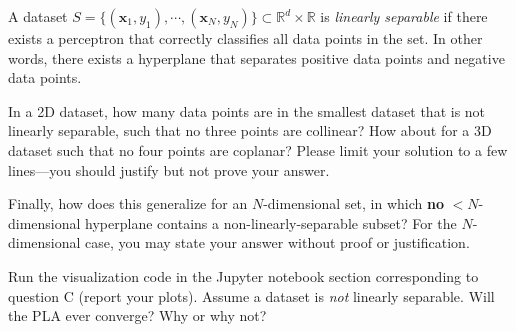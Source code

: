 \begin{solution}


\end{solution}

\begin{problem}[4]
A dataset $S = \{(\mathbf{x}_1, y_1),\cdots,(\mathbf{x}_N, y_N)\} \subset \mathbb{R}^d \times \mathbb{R}$ is \emph{linearly separable} if there exists a perceptron that correctly classifies all data points in the set.
In other words, there exists a hyperplane that separates positive data points and negative data points.

In a 2D dataset, how many data points are in the smallest dataset that is not linearly separable, such that no three points are collinear? How about for a 3D dataset such that no four points are coplanar?
Please limit your solution to a few lines---you should justify but not prove your answer.

Finally, how does this generalize for an $N$-dimensional set, in which \textbf{no} $<$$N$-dimensional hyperplane contains a non-linearly-separable subset?
	For the $N$-dimensional case, you may state your answer without proof or justification.
\end{problem}
\begin{solution}

\end{solution}

\begin{problem}[2]
Run the visualization code in the Jupyter notebook section corresponding to question C (report your plots).
Assume a dataset is \emph{not} linearly separable.
Will the PLA ever converge?
Why or why not?
\end{problem}
\begin{solution}

\end{solution}


